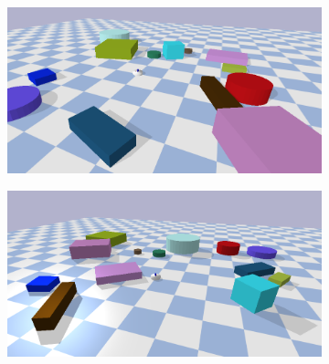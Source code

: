 \begin{figure}[H]
    \centering
    \begin{subfigure}{.49\textwidth}
    \centering
    \includegraphics[width=\textwidth]{figures/results/random1}
    \end{subfigure}
    \hfill
    \begin{subfigure}{.49\textwidth}
    \centering
    \includegraphics[width=\textwidth]{figures/results/random2}
    \end{subfigure}


\end{figure}
